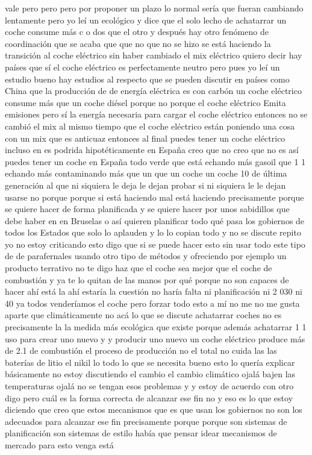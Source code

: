 vale pero pero pero por proponer un plazo lo normal sería que fueran cambiando lentamente pero yo leí un ecológico y dice que el solo lecho de achatarrar un coche consume más c o dos que el otro y después hay otro fenómeno de coordinación que se acaba que que no que no se hizo se está haciendo la transición al coche eléctrico sin haber cambiado el mix eléctrico quiero decir hay países que sí el coche eléctrico es perfectamente neutro pero pues yo leí un estudio bueno hay estudios al respecto que se pueden discutir en países como China que la producción de de energía eléctrica es con carbón un coche eléctrico consume más que un coche diésel porque no porque el coche eléctrico Emita emisiones pero sí la energía necesaria para cargar el coche eléctrico entonces no se cambió el mix al mismo tiempo que el coche eléctrico están poniendo una cosa con un mix que es anticuaz entonces al final puedes tener un coche eléctrico incluso en es podrida hipotéticamente en España creo que no creo que no es así puedes tener un coche en España todo verde que está echando más gasoil que 1 1 echando más contaminando más que un que un coche un coche 10 de última generación al que ni siquiera le deja le dejan probar si ni siquiera le le dejan usarse no porque porque si está haciendo mal está haciendo precisamente porque se quiere hacer de forma planificada y se quiere hacer por unos sabidillos que debe haber en en Bruselas o así quieren planificar todo qué pasa los gobiernos de todos los Estados que solo lo aplauden y lo lo copian todo y no se discute repito yo no estoy criticando esto digo que si se puede hacer esto sin usar todo este tipo de de parafernales usando otro tipo de métodos y ofreciendo por ejemplo un producto terrativo no te digo haz que el coche sea mejor que el coche de combustión y ya te lo quitan de las manos por qué porque no son capaces de hacer ahí está la ahí estaría la cuestión no haría falta ni planificación ni 2 030 ni 40 ya todos venderíamos el coche pero forzar todo esto a mí no me no me gusta aparte que climáticamente no acá lo que se discute achatarrar coches no es precisamente la la medida más ecológica que existe porque además achatarrar 1 1 uso para crear uno nuevo y y producir uno nuevo un coche eléctrico produce más de 2.1 de combustión el proceso de producción no el total no cuida las las baterías de litio el nikil lo todo lo que se necesita bueno esto lo quería explicar básicamente no estoy discutiendo el cambio el cambio climático ojalá bajen las temperaturas ojalá no se tengan esos problemas y y estoy de acuerdo con otro digo pero cuál es la forma correcta de alcanzar ese fin no y eso es lo que estoy diciendo que creo que estos mecanismos que es que usan los gobiernos no son los adecuados para alcanzar ese fin precisamente porque porque son sistemas de planificación son sistemas de estilo había que pensar idear mecanismos de mercado para esto venga está
